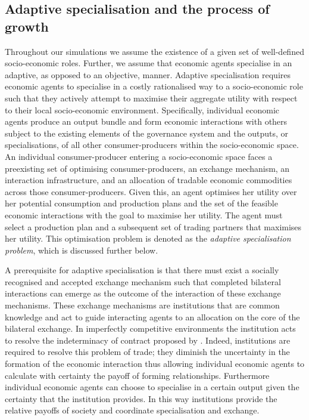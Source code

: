 \subsection{Adaptive specialisation and the process of growth}

Throughout our simulations we assume the existence of a given set of well-defined socio-economic roles. Further, we assume that economic agents specialise in an adaptive, as opposed to an objective, manner. Adaptive specialisation requires economic agents to specialise in a costly rationalised way to a socio-economic role such that they actively attempt to maximise their aggregate utility with respect to their local socio-economic environment. Specifically, individual economic agents produce an output bundle and form economic interactions with others subject to the existing elements of the governance system and the outputs, or specialisations, of all other consumer-producers within the socio-economic space. An individual consumer-producer entering a socio-economic space faces a preexisting set of optimising consumer-producers, an exchange mechanism, an interaction infrastructure, and an allocation of tradable economic commodities across those consumer-producers. Given this, an agent optimises her utility over her potential consumption and production plans and the set of the feasible economic interactions with the goal to maximise her utility. The agent must select a production plan and a subsequent set of trading partners that maximises her utility. This optimisation problem is denoted as the \emph{adaptive specialisation problem}, which is discussed further below.

A prerequisite for adaptive specialisation is that there must exist a socially recognised and accepted exchange mechanism such that completed bilateral interactions can emerge as the outcome of the interaction of these exchange mechanisms. These exchange mechanisms are institutions that are common knowledge and act to guide interacting agents to an allocation on the core of the bilateral exchange. In imperfectly competitive environments the institution acts to resolve the indeterminacy of contract proposed by \citet{Edgeworth1881}. Indeed, institutions are required to resolve this problem of trade; they diminish the uncertainty in the formation of the economic interaction thus allowing individual economic agents to calculate with certainty the payoff of forming relationships. Furthermore individual economic agents can choose to specialise in a certain output given the certainty that the institution provides. In this way institutions provide the relative payoffs of society and coordinate specialisation and exchange.

